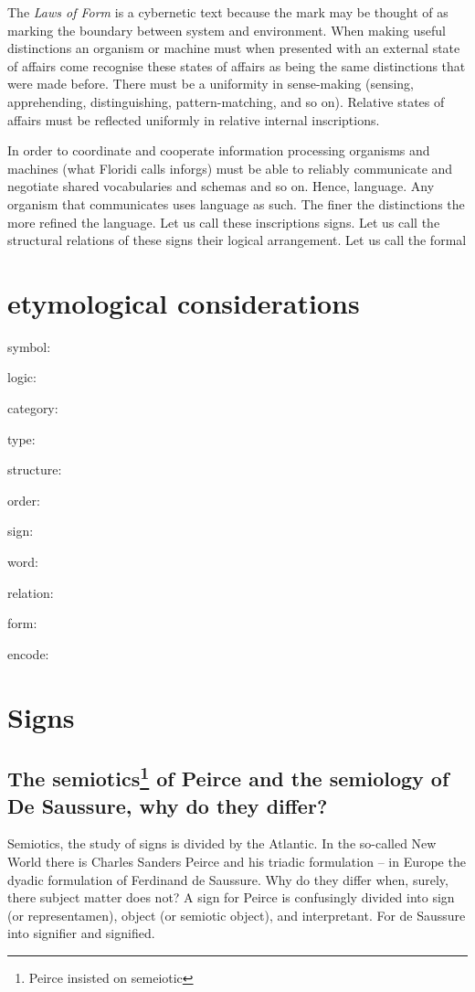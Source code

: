 \documentclass[dah,phd,a4paper]{xe_uccthesis}
\newcommand{\work}[1] {\textit{#1}}
\begin{document}
	The \work{Laws of Form} is a cybernetic text because the mark may be thought of as marking the boundary between system and environment. When making useful distinctions an organism or machine must when presented with an external state of affairs come recognise these states of affairs as being the same distinctions that were made before. There must be a uniformity in sense-making (sensing, apprehending, distinguishing, pattern-matching, and so on). Relative states of affairs must be reflected uniformly in relative internal inscriptions.
	
	In order to coordinate and cooperate information processing organisms and machines (what Floridi calls inforgs) must be able to reliably communicate and negotiate shared vocabularies and schemas and so on. Hence, language. Any organism that communicates uses language as such. The finer the distinctions the more refined the language.
	Let us call these inscriptions signs. Let us call the structural relations of these signs their logical arrangement. Let us call the formal

\section{etymological considerations}

symbol:

logic:

category:

type:

structure:

order:

sign:

word:

relation:

form:

encode:

\section{Signs}

\subsection{The semiotics\texorpdfstring{\footnote{Peirce insisted on semeiotic}}{} of Peirce and the semiology of De Saussure, why do they differ?}

	Semiotics, the study of signs is divided by the Atlantic. In the so-called New World there is Charles Sanders Peirce and his triadic formulation – in Europe the dyadic formulation of Ferdinand de Saussure. Why do they differ when, surely, there subject matter does not? A sign for Peirce is confusingly divided into sign (or representamen), object (or semiotic object), and interpretant. For de Saussure into signifier and signified.
	
\end{document}
